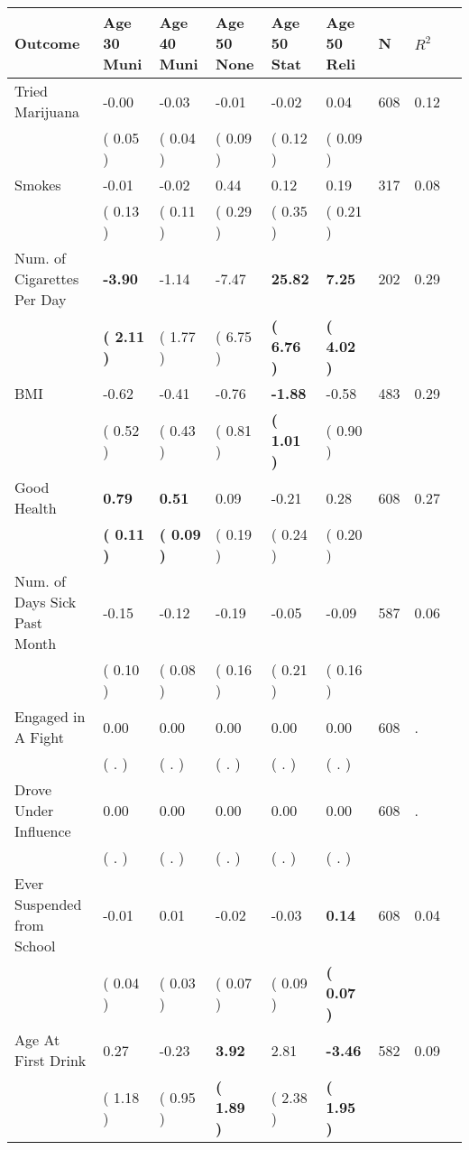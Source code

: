 \begin{tabular}{L{6.2cm} C{1.8cm} C{1.8cm} C{1.8cm} C{1.8cm} C{1.8cm} C{1.8cm} C{0.3cm} C{0.3cm}}
\toprule
 \textbf{Outcome} & \textbf{Age 30 Muni} & \textbf{Age 40 Muni} & \textbf{Age 50 None} & \textbf{Age 50 Stat} & \textbf{Age 50 Reli} & \textbf{N} & \textbf{$ R^2$} \\
\midrule
Tried Marijuana &     -0.00 &     -0.03 &     -0.01 &     -0.02 &      0.04  & 608 &       0.12 \\ 
 & (     0.05 ) & (     0.04 ) & (     0.09 ) & (     0.12 ) & (     0.09 )  & \\
Smokes &     -0.01 &     -0.02 &      0.44 &      0.12 &      0.19  & 317 &       0.08 \\ 
 & (     0.13 ) & (     0.11 ) & (     0.29 ) & (     0.35 ) & (     0.21 )  & \\
Num. of Cigarettes Per Day & \textbf{    -3.90} &     -1.14 &     -7.47 & \textbf{    25.82} & \textbf{     7.25}  & 202 &       0.29 \\ 
 & \textbf{(     2.11 )} & (     1.77 ) & (     6.75 ) & \textbf{(     6.76 )} & \textbf{(     4.02 )}  & \\
BMI &     -0.62 &     -0.41 &     -0.76 & \textbf{    -1.88} &     -0.58  & 483 &       0.29 \\ 
 & (     0.52 ) & (     0.43 ) & (     0.81 ) & \textbf{(     1.01 )} & (     0.90 )  & \\
Good Health & \textbf{     0.79} & \textbf{     0.51} &      0.09 &     -0.21 &      0.28  & 608 &       0.27 \\ 
 & \textbf{(     0.11 )} & \textbf{(     0.09 )} & (     0.19 ) & (     0.24 ) & (     0.20 )  & \\
Num. of Days Sick Past Month &     -0.15 &     -0.12 &     -0.19 &     -0.05 &     -0.09  & 587 &       0.06 \\ 
 & (     0.10 ) & (     0.08 ) & (     0.16 ) & (     0.21 ) & (     0.16 )  & \\
Engaged in A Fight &      0.00 &      0.00 &      0.00 &      0.00 &      0.00  & 608 &          . \\ 
 & (        . ) & (        . ) & (        . ) & (        . ) & (        . )  & \\
Drove Under Influence &      0.00 &      0.00 &      0.00 &      0.00 &      0.00  & 608 &          . \\ 
 & (        . ) & (        . ) & (        . ) & (        . ) & (        . )  & \\
Ever Suspended from School &     -0.01 &      0.01 &     -0.02 &     -0.03 & \textbf{     0.14}  & 608 &       0.04 \\ 
 & (     0.04 ) & (     0.03 ) & (     0.07 ) & (     0.09 ) & \textbf{(     0.07 )}  & \\
Age At First Drink &      0.27 &     -0.23 & \textbf{     3.92} &      2.81 & \textbf{    -3.46}  & 582 &       0.09 \\ 
 & (     1.18 ) & (     0.95 ) & \textbf{(     1.89 )} & (     2.38 ) & \textbf{(     1.95 )}  & \\
\bottomrule
\end{tabular}
